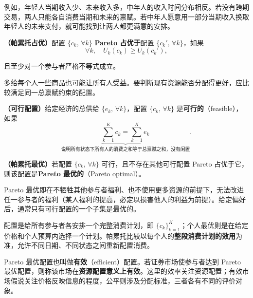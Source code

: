例如，年轻人当期收入少、未来收入多，中年人的收入时间分布相反。若没有跨期交易，两人只能各自消费当期和未来的禀赋。若中年人愿意用一部分当期收入换取年轻人的未来支付，就可能找到让两人都更满意的安排。

\begin{tcolorbox}[knowledge]
\textbf{（帕累托占优）}\quad 配置 $\{c_k,\,\forall k\}$ \textbf{Pareto 占优于}配置 $\{c_k',\,\forall k\}$，如果
\[
    \forall k,\quad U_k(c_k)\ge U_k(c_k'),
\]

且至少对一个参与者严格不等式成立。
\end{tcolorbox}

多给每个人一些商品也可能让所有人受益。要判断现有资源能否分配得更好，应比较满足同一总禀赋约束的配置。

\begin{tcolorbox}[knowledge]
\textbf{（可行配置）}\quad 给定经济的总供给 $\{e_k,\,\forall k\}$，配置 $\{c_k,\,\forall k\}$ 是\textbf{可行的}（feasible），如果
\[
    \underbrace{\sum_{k=1}^{K}c_k=\sum_{k=1}^{K}e_k}_{\text{说明所有状态下所有人的消费之和等于总禀赋之和，没有闲置}}.
\]
\end{tcolorbox}

\begin{tcolorbox}[knowledge]
\textbf{（帕累托最优）}\quad 若配置 $\{c_k,\,\forall k\}$ 可行，且不存在其他可行配置 Pareto 占优于它，则该配置是\textbf{Pareto 最优的}（Pareto optimal）。
\end{tcolorbox}

Pareto 最优即在不牺牲其他参与者福利、也不使用更多资源的前提下，无法改进任一参与者的福利（某人福利的提高，必定以损害他人的利益为前提）。给定偏好后，通常只有可行配置的一个子集是最优的。

配置是给所有参与者各安排一个完整消费计划，即 $\{c_k\}_{k=1}^{K}$；个人最优则是在给定价格和个人预算内选择一个计划。帕累托比较以每个人的\textbf{整段消费计划的效用}为准，允许不同日期、不同状态之间重新配置消费。

Pareto 最优配置也叫做\textbf{有效}（efficient）配置。若证券市场使参与者达到 Pareto 最优配置，则称该市场在\textbf{资源配置意义上有效}。这里的效率关注资源配置；有效市场假说关注价格反映信息的程度，公平则涉及分配标准，三者各有不同的评价对象。

